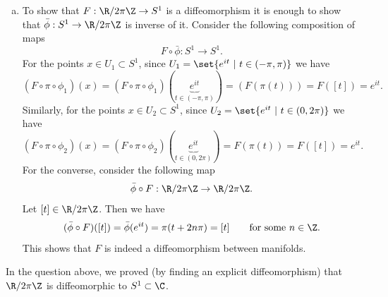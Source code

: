 \begin{solution}
\begin{enumerate}[(a)]
		\item To show that $ F:\R/2\pi\Z \to S^1 $ is a diffeomorphism it is enough to show that $ \bar{\phi} : S^1 \to \R/2\pi\Z $ is inverse of it. Consider the following composition of maps
		\[ F\circ\bar{\phi}: S^1 \to S^1. \]
		For the points $ x \in U_1 \subset S^1 $, since $ U_1 = \set{e^{it}\ |\ t\in(-\pi,\pi)} $ we have
		\[ (F\circ\pi\circ\phi_1)(x) = (F\circ\pi\circ\phi_1)(\underbrace{e^{it}}_{t\in(-\pi,\pi)}) = (F(\pi(t))) = F([t]) = e^{it}.  \]
		Similarly, for the points $ x \in U_2 \subset S^1 $, since $ U_2 = \set{e^{it}\ |\ t \in (0,2\pi)} $ we have 
		\[ (F\circ\pi\circ\phi_2)(x) = (F\circ\pi\circ\phi_2)(\underbrace{e^{it}}_{t\in(0,2\pi)}) = F(\pi(t)) = F([t]) = e^{it}. \]
		For the converse, consider the following map
		\[ \bar{\phi}\circ F : \R/2\pi\Z \to \R/2\pi\Z. \]
		Let $ [t] \in \R/2\pi\Z $. Then we have
		\[ (\bar{\phi}\circ F)([t]) = \bar{\phi}(e^{it}) = \pi(t + 2n\pi)  = [t] \qquad \text{for some $ n\in \Z $}. \]
		This shows that $ F $ is indeed a diffeomorphism between manifolds.
	\end{enumerate}
	\begin{summary}
		In the question above, we proved (by finding an explicit diffeomorphism) that $ \R/2\pi\Z $ is diffeomorphic to $ S^1 \subset \C $.
	\end{summary}
\end{solution}

